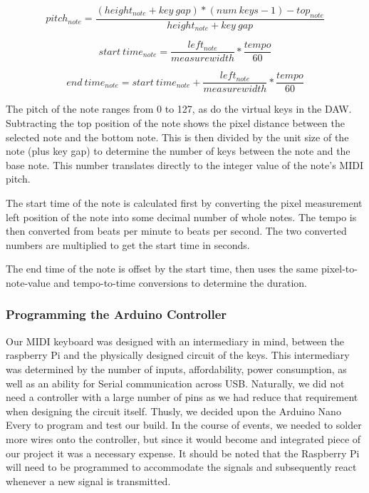 \begin{equation} \label{get_pitch}
  pitch_{note} = \frac{(height_{note} + key\:gap) * (num\:keys - 1) - top_{note}}{height_{note} + key\:gap}
\end{equation}

\begin{equation} \label{get_start}
  start\:time_{note} = \frac{left_{note}}{measure width} * \frac{tempo}{60}
\end{equation}

\begin{equation} \label{get_end}
  end\:time_{note} = start\:time_{note} + \frac{left_{note}}{measure width} * \frac{tempo}{60}
\end{equation}

The pitch of the note ranges from 0 to 127, as do the virtual keys in the DAW.
Subtracting the top position of the note shows the pixel
distance between the selected note and the bottom note. This is then divided by the unit size of the
note (plus key gap) to determine the number of keys between the note and the base note. This number
translates directly to the integer value of the note's MIDI pitch.

The start time of the note is calculated first by converting the pixel measurement left position
of the note into some decimal number of whole notes. The tempo is then converted from beats per
minute to beats per second. The two converted numbers are multiplied to get the start time in
seconds.

The end time of the note is offset by the start time, then uses the same pixel-to-note-value and
tempo-to-time conversions to determine the duration.

\subsubsection{Programming the Arduino Controller}

Our MIDI keyboard was designed with an intermediary in mind, between the raspberry Pi and
the physically designed circuit of the keys. This intermediary was determined by the
number of inputs, affordability, power consumption, as well as an ability for Serial
communication across USB. Naturally, we did not need a controller with a large number of
pins as we had reduce that requirement when designing the circuit itself. Thusly, we
decided upon the Arduino Nano Every to program and test our build. In the course of
events, we needed to solder more wires onto the controller, but since it would become and
integrated piece of our project it was a necessary expense. It should be noted that the
Raspberry Pi will need to be programmed to accommodate the signals and subsequently react
whenever a new signal is transmitted.

